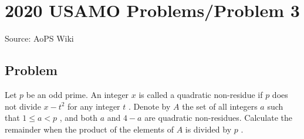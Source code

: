 \documentclass[12pt]{article}
\begin{document}
\section*{{2020 USAMO Problems/Problem 3}}
Source: AoPS Wiki

\subsection*{Problem}
Let $p$ be an odd prime. An integer $x$ is called a quadratic non-residue if $p$ does not divide $x - t^2$ for any integer $t$ . Denote by $A$ the set of all integers $a$ such that $1 \le a < p$ , and both $a$ and $4 - a$ are quadratic non-residues. Calculate the remainder when the product of the elements of $A$ is divided by $p$ .
\end{document}
